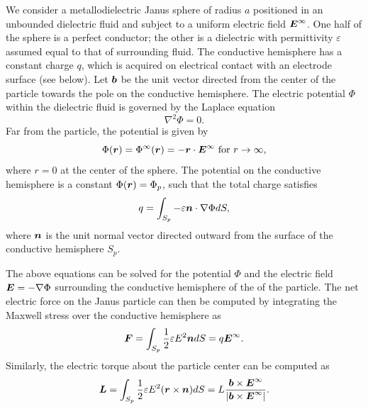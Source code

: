 \begin{appendices}
We consider a metallodielectric Janus sphere of radius $a$ positioned in an unbounded dielectric fluid and subject to a uniform electric field $\boldsymbol{E}^{\infty}$.
One half of the sphere is a perfect conductor; the other is a dielectric with permittivity $\varepsilon$ assumed equal to that of surrounding fluid. 
The conductive hemisphere has a constant charge $q$, which is acquired on electrical contact with an electrode surface (see below).
Let $\boldsymbol{b}$ be the unit vector directed from the center of the particle towards the pole on the conductive hemisphere.
The electric potential $\Phi$ within the dielectric fluid is governed by the Laplace equation
\begin{equation}
    \nabla^2\Phi = 0. \label{eq:laplace}
\end{equation}
Far from the particle, the potential is given by
\begin{equation}
    \Phi(\boldsymbol{r}) = \Phi^{\infty}(\boldsymbol{r}) = -\boldsymbol{r}\cdot\boldsymbol{E}^{\infty} \text{ for } r\rightarrow\infty,
\end{equation}
where $r=0$ at the center of the sphere.
The potential on the conductive hemisphere is a constant $\Phi(\boldsymbol{r})=\Phi_p$, such that the total charge satisfies 
\begin{equation}
    q = \int_{S_p} -\varepsilon \boldsymbol{n}\cdot\nabla\Phi dS,\label{eq:charge}
\end{equation}
where $\boldsymbol{n}$ is the unit normal vector directed outward from the surface of the conductive hemisphere $S_p$.

The above equations can be solved for the potential $\Phi$ and the electric field $\boldsymbol{E}=-\nabla\Phi$ surrounding the conductive hemisphere of the of the particle.
The net electric force on the Janus particle can then be computed by integrating the Maxwell stress over the conductive hemisphere as
\begin{equation}
    \boldsymbol{F} =  \int_{S_p} \frac{1}{2}\varepsilon E^2 \boldsymbol{n} dS = q \boldsymbol{E}^{\infty}.
\end{equation}
Similarly, the electric torque about the particle center can be computed as
\begin{equation}
    \boldsymbol{L} =  \int_{S_p} \frac{1}{2}\varepsilon E^2 (\boldsymbol{r}\times \boldsymbol{n}) dS = L \frac{\boldsymbol{b}\times\boldsymbol{E}^{\infty}}{|\boldsymbol{b}\times\boldsymbol{E}^{\infty}|}.
\end{equation}


\end{appendices}
